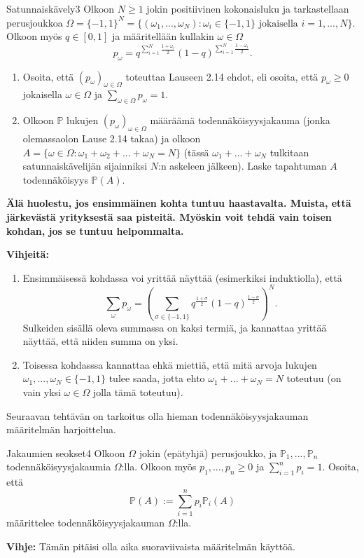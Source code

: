 \documentclass[11pt,a4paper]{amsart}
\newcommand{\1}{\mathbf{1}}
\renewcommand{\P}{\mathbb P}
\begin{document}
\begin{Exercises}{Satunnaiskävely}{3}
Olkoon $N\geq 1$ jokin positiivinen kokonaisluku ja tarkastellaan perusjoukkoa $\Omega=\{-1,1\}^N=\{(\omega_1,...,\omega_N): \omega_i\in \{-1,1\} \text{ jokaisella } i=1,...,N\}$. Olkoon myös $q\in [0,1]$ ja määritellään kullakin $\omega\in \Omega$
\[
p_\omega=q^{\sum_{i=1}^N\frac{1+ \omega_i}{2}}(1-q)^{\sum_{i=1}^N\frac{1-\omega_i}{2}}.
\]
\begin{enumerate}
\item Osoita, että $(p_\omega)_{\omega\in \Omega}$ toteuttaa Lauseen 2.14 ehdot, eli osoita, että $p_\omega\geq 0$ jokaisella $\omega\in \Omega$ ja $\sum_{\omega\in \Omega}p_\omega=1$.
\item Olkoon $\P$ lukujen $(p_\omega)_{\omega\in \Omega}$ määräämä todennäköisyysjakauma (jonka olemassaolon Lause 2.14 takaa) ja olkoon $A=\{\omega\in \Omega: \omega_1+\omega_2+...+\omega_N=N\}$ (tässä $\omega_1+...+\omega_N$ tulkitaan satunnaiskävelijän sijainniksi $N$:n askeleen jälkeen). Laske  tapahtuman $A$ todennäköisyys $\P(A)$.
\end{enumerate}

{\bf Älä huolestu, jos ensimmäinen kohta tuntuu haastavalta. Muista, että järkevästä yrityksestä saa pisteitä. Myöskin voit tehdä vain toisen kohdan, jos se tuntuu helpommalta.}

\medskip 

{\bf Vihjeitä:} 
\begin{enumerate}
\item Ensimmäisessä kohdassa voi yrittää näyttää (esimerkiksi induktiolla), että  
\[
\sum_{\omega}p_\omega= \left(\sum_{\sigma\in \{-1,1\}}q^{\frac{1+\sigma}{2}}(1-q)^{\frac{1-\sigma}{2}}\right)^N.
\]
Sulkeiden sisällä oleva summassa on kaksi termiä, ja kannattaa yrittää näyttää, että niiden summa on yksi. 

\item Toisessa kohdasssa kannattaa ehkä miettiä, että mitä arvoja lukujen $\omega_1,...,\omega_N\in \{-1,1\}$ tulee saada, jotta ehto $\omega_1+...+\omega_N=N$ toteutuu (on vain yksi $\omega\in \Omega$ jolla tämä toteutuu).
\end{enumerate}
\end{Exercises}


Seuraavan tehtävän on tarkoitus olla hieman todennäköisyysjakauman määritelmän harjoittelua.

\begin{Exercises}{Jakaumien seokset}{4}
Olkoon $\Omega$ jokin (epätyhjä) perusjoukko, ja $\P_1,...,\P_n$ todennäköisyysjakaumia $\Omega$:lla. Olkoon myös $p_1,...,p_n\geq 0$ ja $\sum_{i=1}^n p_i=1$. Osoita, että 
\[
\P(A):=\sum_{i=1}^n p_i \P_i(A)
\] 
määrittelee todennäköisyysjakauman $\Omega$:lla.

\medskip

{\bf Vihje:} Tämän pitäisi olla aika suoraviivaista määritelmän käyttöä.
\end{Exercises}
\end{document}
